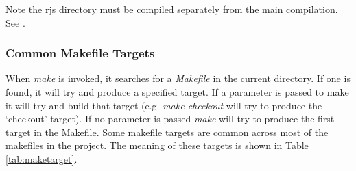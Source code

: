 \documentclass[10pt,a4paper]{article}
\begin{document}

Note the rjs directory must be compiled separately from the main compilation. See \cite{bib:rtp}.

\subsubsection{Common Makefile Targets}
When {\em make} is invoked, it searches for a {\em Makefile} in the current directory. If one is found, it
will try and produce a specified target. If a parameter is passed to make it will try and build that target
(e.g. {\em make checkout} will try to produce the `checkout' target). If no parameter is passed {\em make} will
try to produce the first target in the Makefile.
Some makefile targets are common across most of the makefiles in the project. The meaning of these targets is
shown in Table \ref{tab:maketarget}.
\end{document}
